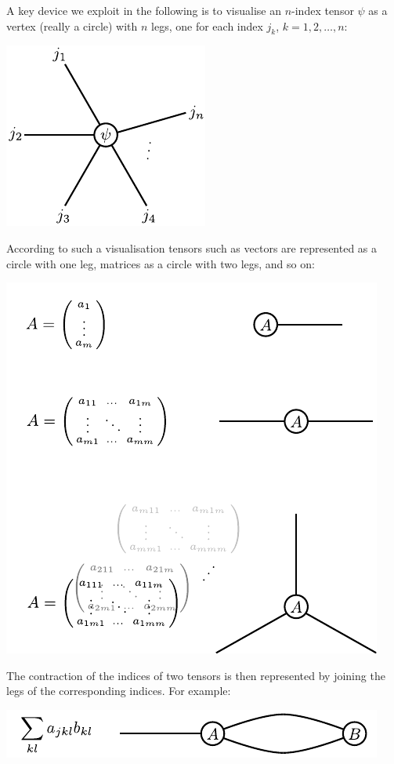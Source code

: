 \documentclass[twocolumn,lengthcheck,superscriptaddress]{revtex4-1}
\theoremstyle{definition}
\theoremstyle{remark}
\begin{document}
A key device we exploit in the following is to visualise an $n$-index tensor $\psi$ as a vertex (really a circle) with $n$ legs, one for each index $j_k$, $k = 1, 2, \ldots, n$:
\begin{center}
\includegraphics{psitns.pdf}
\end{center}
According to such a visualisation tensors such as vectors are represented as a circle with one leg, matrices as a circle with two legs, and so on:
\begin{center}
\includegraphics{tns1.pdf}
\end{center}
The contraction of the indices of two tensors is then represented by joining the legs of the corresponding indices. For example:
\begin{center}
\includegraphics{tns2.pdf}
\end{center}
\end{document}
